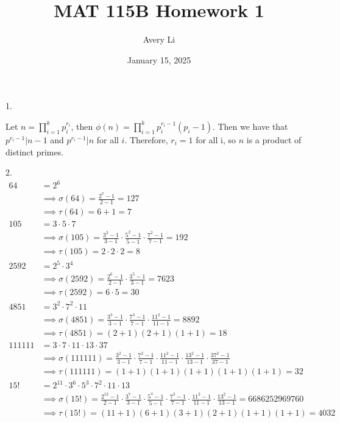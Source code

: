 \documentclass[11pt]{article}
\title{MAT 115B Homework 1}
\author{Avery Li}
\date{January 15, 2025}
\begin{document}
\maketitle


\begin{flushleft}
1.
\end{flushleft}
Let $n=\prod_{i=1}^k p_i^{r_i}$, then $\phi(n)=\prod_{i=1}^k p_i^{r_i-1}(p_i-1)$. Then we have that
$p^{r_i-1}\vert n-1$ and $p^{r_i-1}\vert n$ for all $i$. Therefore, $r_i=1$ for all i, so $n$ is a product
of distinct primes.

\begin{flushleft}
2.
\begin{align*}
    64&=2^6 \\
    &\implies \sigma(64)=\frac{2^7-1}{2-1}=127\\
    &\implies \tau(64)=6+1=7\\
    105&=3\cdot 5\cdot 7\\
    &\implies \sigma(105)=\frac{3^2-1}{3-1}\cdot\frac{5^2-1}{5-1}\cdot\frac{7^2-1}{7-1}=192\\
    &\implies \tau(105)=2\cdot 2\cdot 2=8\\
    2592&=2^5\cdot 3^4 \\
    &\implies \sigma(2592)=\frac{2^6-1}{2-1}\cdot\frac{3^5-1}{3-1}=7623\\
    &\implies \tau(2592)=6\cdot 5=30\\
    4851&=3^2\cdot 7^2\cdot 11\\
    &\implies \sigma(4851)=\frac{3^3-1}{3-1}\cdot\frac{7^3-1}{7-1}\cdot\frac{11^2-1}{11-1}=8892\\
    &\implies \tau(4851)=(2+1)(2+1)(1+1)=18\\
    111111&=3\cdot 7\cdot 11\cdot 13\cdot 37\\
    &\implies \sigma(111111)=\frac{3^2-1}{3-1}\cdot\frac{7^2-1}{7-1}\cdot\frac{11^2-1}{11-1}\cdot\frac{13^2-1}{13-1}\cdot\frac{37^2-1}{37-1}\\
    &\implies \tau(111111)=(1+1)(1+1)(1+1)(1+1)(1+1)=32\\
    15!&=2^{11}\cdot 3^6\cdot 5^3\cdot 7^2\cdot 11\cdot 13\\
    &\implies \sigma(15!)=\frac{2^{12}-1}{2-1}\cdot\frac{3^7-1}{3-1}\cdot\frac{5^4-1}{5-1}\cdot\frac{7^3-1}{7-1}\cdot\frac{11^2-1}{11-1}\cdot\frac{13^2-1}{13-1}=6686252969760\\
    &\implies \tau(15!)=(11+1)(6+1)(3+1)(2+1)(1+1)(1+1)=4032\\
\end{align*}
\end{flushleft}
\end{document}
